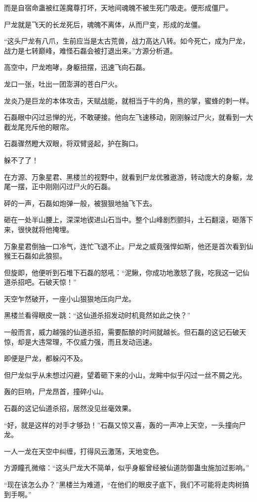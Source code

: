 \begin{this_body}
而是自宿命蛊被红莲魔尊打坏，天地间魂魄不被生死门吸走。便形成僵尸。

尸龙就是飞天的长龙死后，魂魄不离体，从而尸变，形成的龙僵。

“这头尸龙有八爪，生前应当是太古荒兽，战力高达八转。如今死亡，成为尸龙，战力是七转巅峰，难怪石磊会被打退出来。”方源分析道。

高空中，尸龙咆哮，身躯扭摆，迅速飞向石磊。

龙口一张，吐出一团澎湃的苍白尸火。

龙炎乃是巨龙的本体攻击，天赋战能，就相当于牛的角，熊的掌，蜜蜂的刺一样。

石磊眼中闪过忌惮的光，不敢硬接。他向左飞速移动，刚刚躲过尸火，就看到一大截龙尾充斥他的眼帘。

石磊骤然瞪大双眼，将双臂竖起，护在胸口。

躲不了了！

在方源、万象星君、黑楼兰的视野中，就看到尸龙优雅遨游，转动庞大的身躯，龙尾一摆，正中刚刚闪过尸火的石磊。

砰的一声，石磊如炮弹一般，被狠狠地抽飞下去。

砸在一处半山腰上，深深地锲进山石当中。整个山峰剧烈颤抖，土石翻滚，砸落下来，很快就将他掩埋。

万象星君倒抽一口冷气，连忙飞退不止。尸龙之威竟强悍如斯，他还是首次看到仙猴王石磊如此狼狈。

但旋即，他便听到石堆下石磊的怒吼：“泥鳅，你成功地激怒了我，吃我这一记仙道杀招吧。石破天惊！”

天空乍然破开，一座小山狠狠地压向尸龙。

黑楼兰看得眼皮一跳：“这仙道杀招发动时机竟然如此之快？”

一般而言，威力越强的仙道杀招，需要酝酿的时间就越长。但石磊的这记石破天惊，却是大违常理，不仅威力强，而且发动迅速。

即便是尸龙，都躲闪不及。

但尸龙似乎从未想过闪避，望着砸下来的小山，龙眸中似乎闪过一丝不屑之光。

轰的巨响，尸龙昂首，撞碎小山。

石磊的这记仙道杀招，居然没见丝毫效果。

“好，就是这样的对手才够劲！”石磊又惊又喜，轰的一声冲上天空，一头撞向尸龙。

一人一龙在天空中纠缠，打得风云激荡，天地变色。

方源瞳孔微缩：“这头尸龙大不简单，似乎身躯曾经被仙道防御蛊虫施加过影响。”

“现在该怎么办？”黑楼兰为难道，“在他们的眼皮子底下，我们不可能将走肉树搞到手啊。”

\end{this_body}


